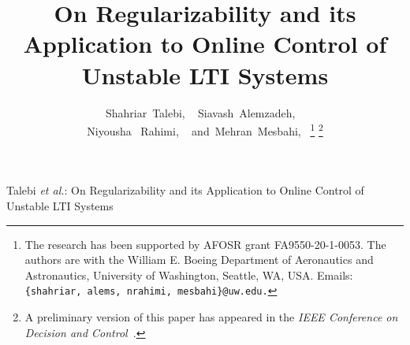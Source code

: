 \documentclass[journal]{IEEEtran}
\theoremstyle{definition}
\theoremstyle{remark}
\begin{document}
\title{
On Regularizability and its Application to Online Control of Unstable LTI Systems}

%
%
%

\author{Shahriar~Talebi, ~
Siavash~Alemzadeh, ~\\
Niyousha ~Rahimi, ~
and~Mehran~Mesbahi,~%
\thanks{The research has been supported by AFOSR grant FA9550-20-1-0053. The authors are with the William E. Boeing Department of Aeronautics and Astronautics, University of Washington, Seattle, WA, USA. Emails: \tt\small \{shahriar, alems, nrahimi, mesbahi\}@uw.edu.}
\thanks{A preliminary version of this paper has appeared in the \textit{ IEEE Conference on Decision and Control~\cite{talebi2020online}}.}}


\markboth{}%
{Talebi \MakeLowercase{\textit{et al.}}: On Regularizability and its Application to Online Control of Unstable LTI Systems}
% 


\end{document}
